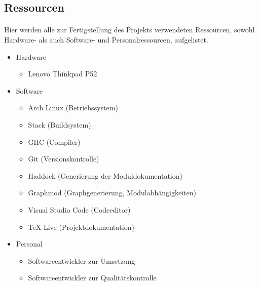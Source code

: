 \subsection{Ressourcen}
\paragraph{}
Hier werden alle zur Fertigstellung des Projekts verwendeten Ressourcen, sowohl
Hardware- als auch Software- und Personalressourcen, aufgelistet.

\begin{itemize}
    \item Hardware \begin{itemize}
              \item Lenovo Thinkpad P52
          \end{itemize}
    \item Software \begin{itemize}
              \item Arch Linux (Betriebssystem) \cite{arch}
              \item Stack (Buildsystem) \cite{stack}
              \item GHC (Compiler) \cite{ghc}
              \item Git (Versionskontrolle) \cite{git}
              \item Haddock (Generierung der Moduldokumentation) \cite{haddock}
              \item Graphmod (Graphgenerierung, Modulabhängigkeiten) \cite{graphmod}
              \item Visual Studio Code (Codeeditor) \cite{vscode}
              \item \TeX -Live (Projektdokumentation) \cite{texlive}
          \end{itemize}
    \item Personal \begin{itemize}
              \item Softwareentwickler zur Umsetzung
              \item Softwareentwickler zur Qualitätskontrolle
          \end{itemize}
\end{itemize}
